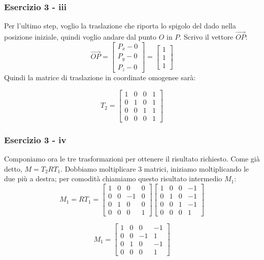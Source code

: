 \documentclass{beamer}
\begin{document}
\begin{frame}
\frametitle{Esercizio 3 - iii}
Per l'ultimo step, voglio la traslazione che riporta lo spigolo del dado nella posizione
iniziale, quindi voglio andare dal punto $O$ in $P$. Scrivo il vettore $\overrightarrow{OP}$:
\begin{displaymath}
    \overrightarrow{OP}
    = 
\begin{bmatrix}
        P_x - 0\\
        P_y - 0\\
        P_z - 0
\end{bmatrix}
    = 
\begin{bmatrix}
        1\\
        1\\
        1
\end{bmatrix}
\end{displaymath}
Quindi la matrice di traslazione in coordinate omogenee sar\`a:

\begin{displaymath}
T_2 = 
\begin{bmatrix}
        1 & 0 & 0 & 1\\
        0 & 1 & 0 & 1\\
        0 & 0 & 1 & 1\\
        0 & 0 & 0 & 1 
\end{bmatrix}
\end{displaymath}
\end{frame}

\begin{frame}
\frametitle{Esercizio 3 - iv}
Componiamo ora le tre trasformazioni per ottenere il risultato richiesto. Come gi\`a detto, $M = T_2 R T_1$.
Dobbiamo moltiplicare 3 matrici, iniziamo moltiplicando le due pi\`u a destra;
    per comodit\`a chiamiamo questo risultato intermedio $M_1$:
\begin{displaymath}
M_1    
    =
    R T_1
    =
\begin{bmatrix}
    1 & 0 &  0 & 0 \\
    0 & 0 & -1 & 0\\
    0 & 1 &  0 & 0\\ 
    0 & 0 &  0 & 1
\end{bmatrix}
\begin{bmatrix}
        1 & 0 & 0 & -1 \\
        0 & 1 & 0 & -1 \\
        0 & 0 & 1 & -1 \\
        0 & 0 & 0 & 1 
\end{bmatrix}
\end{displaymath}

    \begin{displaymath}
   M_1 = 
\begin{bmatrix}
    1 & 0 &  0 & -1 \\
    0 & 0 & -1 &  1 \\
    0 & 1 &  0 & -1 \\ 
    0 & 0 &  0 &  1
\end{bmatrix}
\end{displaymath}
\end{frame}
\end{document}
